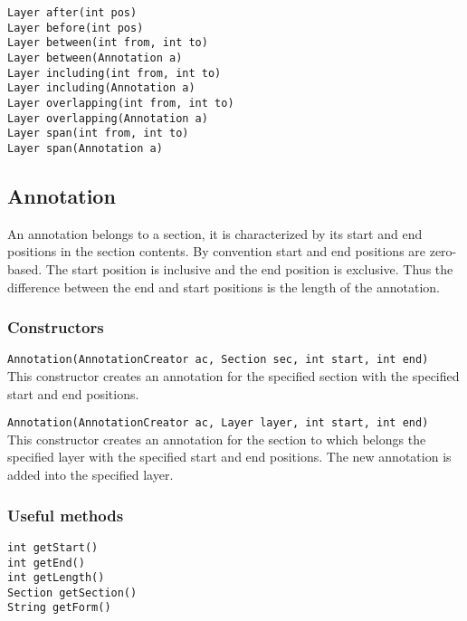 \documentclass[a4paper]{article}
\begin{document}
\texttt{Layer after(int pos)}\\
\texttt{Layer before(int pos)}\\
\texttt{Layer between(int from, int to)}\\
\texttt{Layer between(Annotation a)}\\
\texttt{Layer including(int from, int to)}\\
\texttt{Layer including(Annotation a)}\\
\texttt{Layer overlapping(int from, int to)}\\
\texttt{Layer overlapping(Annotation a)}\\
\texttt{Layer span(int from, int to)}\\
\texttt{Layer span(Annotation a)}\\

\subsection{Annotation}
An annotation belongs to a section, it is characterized by its start and end positions in the section contents.
By convention start and end positions are zero-based.
The start position is inclusive and the end position is exclusive.
Thus the difference between the end and start positions is the length of the annotation.

\subsubsection{Constructors}

\texttt{Annotation(AnnotationCreator ac, Section sec, int start, int end)}\\
This constructor creates an annotation for the specified section with the specified start and end positions.

\texttt{Annotation(AnnotationCreator ac, Layer layer, int start, int end)}\\
This constructor creates an annotation for the section to which belongs the specified layer with the specified start and end positions.
The new annotation is added into the specified layer.

\subsubsection{Useful methods}

\texttt{int getStart()}\\
\texttt{int getEnd()}\\
\texttt{int getLength()}\\
\texttt{Section getSection()}\\
\texttt{String getForm()}\\
\end{document}
